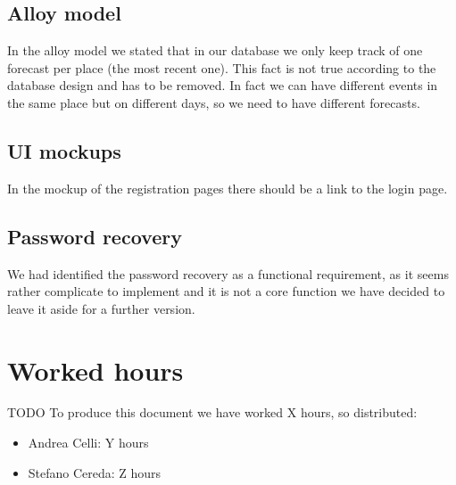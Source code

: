 \documentclass[10pt,a4paper,titlepage]{article}
\begin{document}
\subsection{Alloy model}
In the alloy model we stated that in our database we only keep track of one forecast per place (the most recent one). This fact is not true according to the database design and has to be removed. In fact we can have different events in the same place but on different days, so we need to have different forecasts.
\subsection{UI mockups}
In the mockup of the registration pages there should be a link to the login page. 
\subsection{Password recovery}
We had identified the password recovery as a functional requirement, as it seems rather complicate to implement and it is not a core function we have decided to leave it aside for a further version.

\section{Worked hours}
TODO
To produce this document we have worked X hours, so distributed:
\begin{itemize}
\item Andrea Celli: Y hours
\item Stefano Cereda: Z hours
\end{itemize}

\clearpage
\tableofcontents
\end{document}
